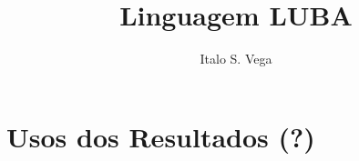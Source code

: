 \documentclass[12pt,graybox,envcountchap,sectrefs]{svmono}
\title{Linguagem LUBA}
\author{Italo S. Vega}
\newcommand{\geralPasta}{../geral}
\newcommand{\itaPasta}{.}
\begin{document}
\maketitle

\tableofcontents


	
    
    
    


	
    
    
    

	
    



	\chapter{Usos dos Resultados (?)}
	\label{cap:resultados} %


	
	
	
	

    
	
	\printindex
\end{document}
